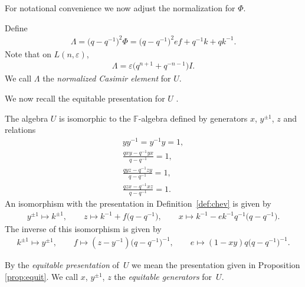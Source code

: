 For notational convenience we now adjust the
normalization for $\Phi$.

\begin{Definition}
\label{def:norm}
Def\/ine
\begin{gather}
\Lambda  = \big(q-q^{-1}\big)^2 \Phi
= \big(q-q^{-1}\big)^2ef +q^{-1}k + qk^{-1}.
\label{eq:lambdaform}
\end{gather}
Note that on
$L(n,\varepsilon)$,
\begin{gather*}
\Lambda  =  \varepsilon\big(q^{n+1}+q^{-n-1}\big)I.
\end{gather*}
We call
$\Lambda$ the {\it normalized Casimir element} for
$U$.
\end{Definition}


We now recall the equitable presentation for
$U$ \cite{equit}.

\begin{Proposition}
\label{prop:equit}
The algebra
$U$ is isomorphic to the
$\mathbb F$-algebra defined by generators
$x$, $y^{\pm 1}$, $z$ and relations
\begin{gather}
 y y^{-1} = y^{-1} y  = 1,
\label{eq:eq0}
\\
 \frac{qxy-q^{-1}yx}{q-q^{-1}} = 1,
\label{eq:eq1}
\\
 \frac{qyz-q^{-1}zy}{q-q^{-1}} = 1,
\label{eq:eq2}
\\
 \frac{qzx-q^{-1}xz}{q-q^{-1}} = 1.
\label{eq:eq3}
\end{gather}
An isomorphism with the presentation in
Definition~{\rm \ref{def:chev}} is given by
\begin{gather*}
 y^{\pm 1} \mapsto k^{\pm 1},
\qquad
 z \mapsto k^{-1} + f\big(q-q^{-1}\big),
\qquad
 x \mapsto k^{-1} - ek^{-1}q^{-1}\big(q-q^{-1}\big).
\end{gather*}
The inverse of this isomorphism is given by
\begin{gather*}
 k^{\pm 1} \mapsto y^{\pm 1},
\qquad
 f\mapsto (z-y^{-1})\big(q-q^{-1}\big)^{-1},
\qquad
 e\mapsto (1-xy)q\big(q-q^{-1}\big)^{-1}.
\end{gather*}
\end{Proposition}


\begin{Definition}
By the {\it equitable presentation} of~$U$ we mean the
presentation given in Proposition
\ref{prop:equit}. We call $x$, $y^{\pm 1}$, $z$ the
{\it equitable generators} for~$U$.
\end{Definition}


